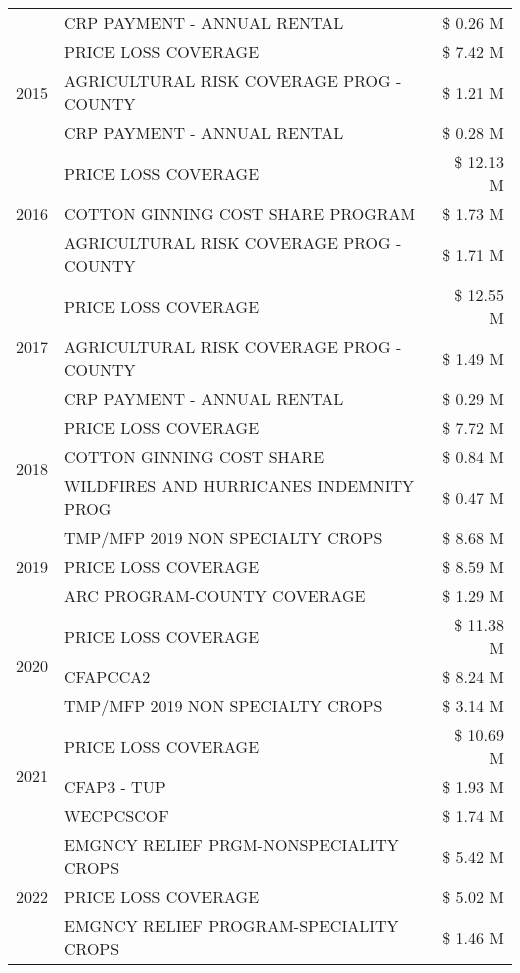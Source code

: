 \begin{tabular}{llr}
 & CRP PAYMENT - ANNUAL RENTAL & \$ 0.26 M \\
\cline{1-3}
\multirow[t]{3}{*}{2015} & PRICE LOSS COVERAGE & \$ 7.42 M \\
 & AGRICULTURAL RISK COVERAGE PROG - COUNTY & \$ 1.21 M \\
 & CRP PAYMENT - ANNUAL RENTAL & \$ 0.28 M \\
\cline{1-3}
\multirow[t]{3}{*}{2016} & PRICE LOSS COVERAGE & \$ 12.13 M \\
 & COTTON GINNING COST SHARE PROGRAM & \$ 1.73 M \\
 & AGRICULTURAL RISK COVERAGE PROG - COUNTY & \$ 1.71 M \\
\cline{1-3}
\multirow[t]{3}{*}{2017} & PRICE LOSS COVERAGE & \$ 12.55 M \\
 & AGRICULTURAL RISK COVERAGE PROG - COUNTY & \$ 1.49 M \\
 & CRP PAYMENT - ANNUAL RENTAL & \$ 0.29 M \\
\cline{1-3}
\multirow[t]{3}{*}{2018} & PRICE LOSS COVERAGE & \$ 7.72 M \\
 & COTTON GINNING COST SHARE & \$ 0.84 M \\
 & WILDFIRES AND HURRICANES INDEMNITY PROG & \$ 0.47 M \\
\cline{1-3}
\multirow[t]{3}{*}{2019} & TMP/MFP 2019 NON SPECIALTY CROPS & \$ 8.68 M \\
 & PRICE LOSS COVERAGE & \$ 8.59 M \\
 & ARC PROGRAM-COUNTY COVERAGE & \$ 1.29 M \\
\cline{1-3}
\multirow[t]{3}{*}{2020} & PRICE LOSS COVERAGE & \$ 11.38 M \\
 & CFAPCCA2 & \$ 8.24 M \\
 & TMP/MFP 2019 NON SPECIALTY CROPS & \$ 3.14 M \\
\cline{1-3}
\multirow[t]{3}{*}{2021} & PRICE LOSS COVERAGE & \$ 10.69 M \\
 & CFAP3 - TUP & \$ 1.93 M \\
 & WECPCSCOF & \$ 1.74 M \\
\cline{1-3}
\multirow[t]{3}{*}{2022} & EMGNCY RELIEF PRGM-NONSPECIALITY CROPS & \$ 5.42 M \\
 & PRICE LOSS COVERAGE & \$ 5.02 M \\
 & EMGNCY RELIEF PROGRAM-SPECIALITY CROPS & \$ 1.46 M \\
\cline{1-3}
\bottomrule
\end{tabular}
